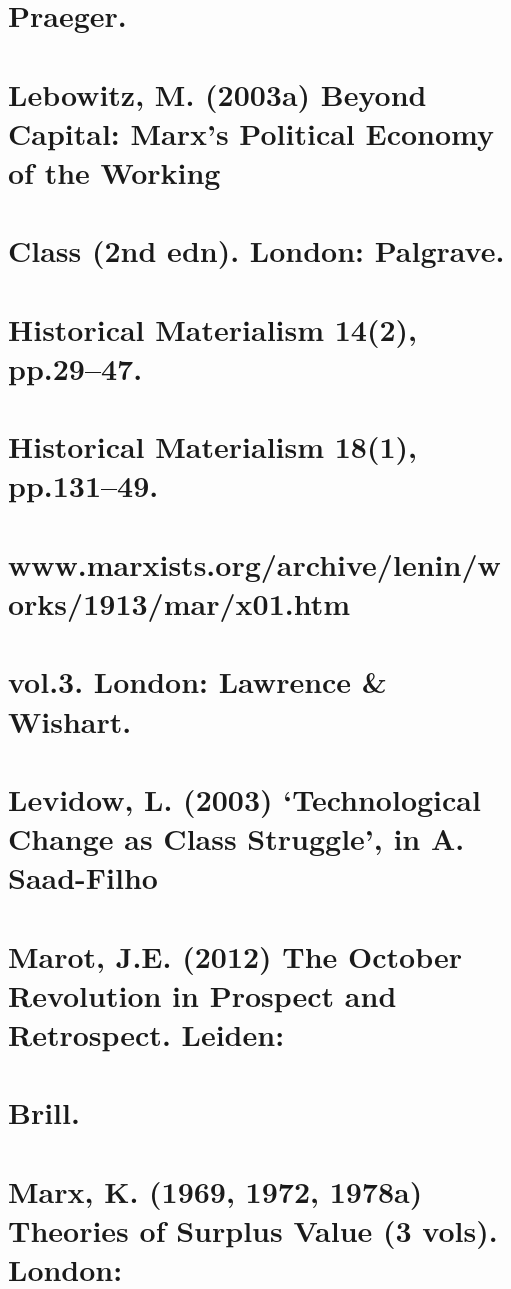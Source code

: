 \section{Praeger.}


\section{Lebowitz, M. (2003a) Beyond Capital: Marx’s Political Economy of the Working}


\section{Class (2nd edn). London: Palgrave.}


\section{Historical Materialism 14(2), pp.29–47.}


\section{Historical Materialism 18(1), pp.131–49.}


\section{www.marxists.org/archive/lenin/works/1913/mar/x01.htm}


\section{vol.3. London: Lawrence & Wishart.}


\section{Levidow, L. (2003) ‘Technological Change as Class Struggle’, in A. Saad-Filho}


\section{Marot, J.E. (2012) The October Revolution in Prospect and Retrospect. Leiden:}


\section{Brill.}


\section{Marx, K. (1969, 1972, 1978a) Theories of Surplus Value (3 vols). London:}


